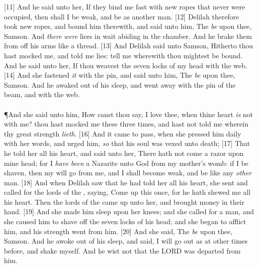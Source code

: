 [11] \textcolor[cmyk]{0.99998,1,0,0}{And he said unto her, If they bind me fast with new ropes that never were occupied, then shall I be weak, and be as another man.}
[12] \textcolor[cmyk]{0.99998,1,0,0}{Delilah therefore took new ropes, and bound him therewith, and said unto him, The  \emph{be} upon thee, Samson. And \emph{there} \emph{were} liers in wait abiding in the chamber. And he brake them from off his arms like a thread.}
[13] \textcolor[cmyk]{0.99998,1,0,0}{And Delilah said unto Samson, Hitherto thou hast mocked me, and told me lies: tell me wherewith thou mightest be bound. And he said unto her, If thou weavest the seven locks of my head with the web.}
[14] \textcolor[cmyk]{0.99998,1,0,0}{And she fastened \emph{it} with the pin, and said unto him, The  \emph{be} upon thee, Samson. And he awaked out of his sleep, and went away with the pin of the beam, and with the web.}\\
\\
\P \textcolor[cmyk]{0.99998,1,0,0}{And she said unto him, How canst thou say, I love thee, when thine heart \emph{is} not with me? thou hast mocked me these three times, and hast not told me wherein thy great strength \emph{lieth}.}
[16] \textcolor[cmyk]{0.99998,1,0,0}{And it came to pass, when she pressed him daily with her words, and urged him, \emph{so} that his soul was vexed unto death;}
[17] \textcolor[cmyk]{0.99998,1,0,0}{That he told her all his heart, and said unto her, There hath not come a razor upon mine head; for I \emph{have} \emph{been} a Nazarite unto God from my mother's womb: if I be shaven, then my  will go from me, and I shall become weak, and be like any \emph{other} man.}
[18] \textcolor[cmyk]{0.99998,1,0,0}{And when Delilah saw that he had told her all his heart, she sent and called for the lords of the , saying, Come up this once, for he hath shewed me all his heart. Then the lords of the  came up unto her, and brought money in their hand.}
[19] \textcolor[cmyk]{0.99998,1,0,0}{And she made him sleep upon her knees; and she called for a man, and she caused him to shave off the seven locks of his head; and she began to afflict him, and his strength went from him.}
[20] \textcolor[cmyk]{0.99998,1,0,0}{And she said, The  \emph{be} upon thee, Samson. And he awoke out of his sleep, and said, I will go out as at other times before, and shake myself. And he wist not that the LORD was departed from him.}\\
